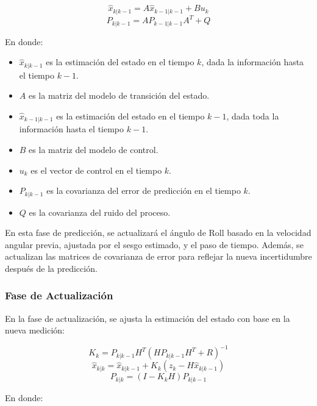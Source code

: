             \[
            \hat{x}_{k|k-1} = A\hat{x}_{k-1|k-1} + B u_k
            \]
            \[
            P_{k|k-1} = A P_{k-1|k-1} A^T + Q
            \]
            \vspace{10px}

            En donde:

            \begin{itemize}
                \item $\hat{x}_{k|k-1}$ es la estimación del estado en el tiempo $k$, dada la información hasta el tiempo $k-1$.
                \item $A$ es la matriz del modelo de transición del estado.
                \item $\hat{x}_{k-1|k-1}$ es la estimación del estado en el tiempo $k-1$, dada toda la información hasta el tiempo $k-1$.
                \item $B$ es la matriz del modelo de control.
                \item $u_k$ es el vector de control en el tiempo $k$.
                \item $P_{k|k-1}$ es la covarianza del error de predicción en el tiempo $k$.
                \item $Q$ es la covarianza del ruido del proceso.
            \end{itemize}
            \vspace{5px}
            En esta fase de predicción, se actualizará el ángulo de Roll basado en la velocidad angular previa, ajustada por el sesgo estimado, y el paso de tiempo. Además, se actualizan las matrices de covarianza de error para reflejar la nueva incertidumbre después de la predicción.

        \subsubsection{ Fase de Actualización}\vspace{5px}

            En la fase de actualización, se ajusta la estimación del estado con base en la nueva medición:

            \[
            K_k = P_{k|k-1} H^T (H P_{k|k-1} H^T + R)^{-1}
            \]
            \[
            \hat{x}_{k|k} = \hat{x}_{k|k-1} + K_k (z_k - H \hat{x}_{k|k-1})
            \]
            \[
            P_{k|k} = (I - K_k H) P_{k|k-1}
            \]
            \vspace{5px}

            En donde:

